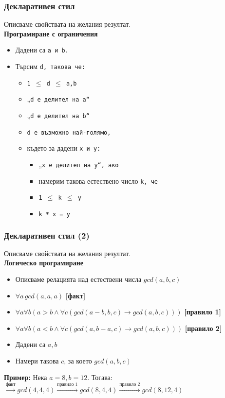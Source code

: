 \documentclass[alsotrans,beameroptions={aspectratio=169}]{beamerswitch}
\begin{document}
\begin{frame}
  \frametitle{Декларативен стил}

  Описваме свойствата на желания резултат.\\[2ex]
  \textbf{Програмиране с ограничения}
  \begin{itemize}
  \item Дадени са \tt a и \tt b.
  \item Търсим \tt d, такова че:
    \begin{itemize}
    \item \tt{1 $\leq$ d $\leq$ a,b}
    \item „\tt d е делител на \tt a“
    \item „\tt d е делител на \tt b“
    \item \tt d е възможно най-голямо,
    \item където за дадени \tt x и \tt y:
      \begin{itemize}
      \item „\tt x е делител на \tt y“, ако
      \item намерим такова естествено число \tt k, че
      \item \tt{1 $\leq$ k $\leq$ y}
      \item \tt k * \tt x = \tt y
      \end{itemize}
    \end{itemize}
  \end{itemize}
\end{frame}

\begin{frame}
  \frametitle{Декларативен стил (2)}

  Описваме свойствата на желания резултат.\\[2ex]
  \textbf{Логическо програмиране}
  \begin{itemize}
  \item Описваме релацията над естествени числа $gcd(a,b,c)$
  \item $\forall a \, gcd(a,a,a)$ \hspace{2ex}\textbf{[факт]}
  \item $\forall a\forall b ( a > b \land \forall c (gcd(a-b,b,c) \rightarrow gcd(a,b,c)))$ \hspace{2ex}\textbf{[правило 1]}
  \item $\forall a\forall b ( a < b \land \forall c (gcd(a,b-a,c) \rightarrow gcd(a,b,c)))$ \hspace{2ex}\textbf{[правило 2]}
  \item Дадени са $a, b$
  \item Намери такова $c$, за което $gcd(a,b,c)$
  \end{itemize}
  \pause
  \textbf{Пример:}
  Нека $a = 8, b = 12$. Тогава:\\
  $\xrightarrow{\text{факт}} gcd(4,4,4) \xrightarrow{\text{правило 1}} gcd(8,4,4) \xrightarrow{\text{правило 2}} gcd(8,12,4)$
\end{frame}
\end{document}
